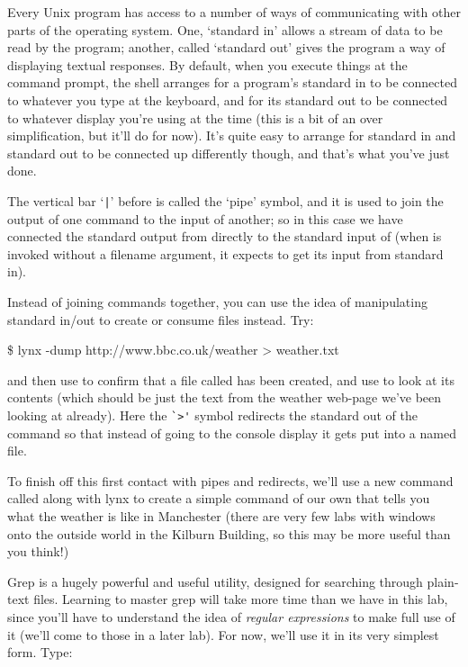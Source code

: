 Every Unix program has access to a number of ways of communicating with other parts of the operating system. One, `standard in' allows a stream of data to be read by the program; another, called `standard out' gives the program a way of displaying textual responses. By default, when you execute things at the command prompt, the shell arranges for a program's standard in to be connected to whatever you type at the keyboard, and for its standard out to be connected to whatever display you're using at the time (this is a bit of an over simplification, but it'll do for now). It's quite easy to arrange for standard in and standard out to be connected up differently though, and that's what you've just done.

The vertical bar `\verb-|-' before  is called the `pipe' symbol, and it is used to join the output of one command to the input of another; so in this case we have connected the standard output from  directly to the standard input of  (when  is invoked without a filename argument, it expects to get its input from standard in). 

Instead of joining commands together, you can use the idea of manipulating standard in/out to create or consume files instead. Try:

\begin{ttoutenv}
\$ lynx -dump http://www.bbc.co.uk/weather > weather.txt
\end{ttoutenv}

and then use  to confirm that a file called  has been created, and use  to look at its contents (which should be just the text from the weather web-page we've been looking at already). Here the \verb-`>'- symbol redirects the standard out of the  command so that instead of going to the console display it gets put into a named file. 

To finish off this first contact with pipes and redirects, we'll use a new command called  along with lynx to create a simple command of our own that tells you what the weather is like in Manchester (there are very few labs with windows onto the outside world in the Kilburn Building, so this may be more useful than you think!) 

Grep is a hugely powerful and useful utility, designed for searching through plain-text files. Learning to master grep will take more time than we have in this lab, since you'll have to understand the idea of \textit{regular expressions} to make full use of it (we'll come to those in a later lab). For now, we'll use it in its very simplest form. Type:

